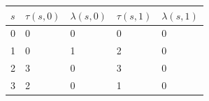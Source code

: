 \begin{tabular}{lllll}
\toprule
$s$ & $\tau(s,0)$ & $\lambda(s,0)$ & $\tau(s,1)$ & $\lambda(s,1)$ \\
\midrule
0 & 0 & 0 & 0 & 0 \\
1 & 0 & 1 & 2 & 0 \\
2 & 3 & 0 & 3 & 0 \\
3 & 2 & 0 & 1 & 0 \\
\bottomrule
\end{tabular}
